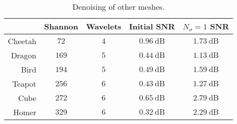 \begin{table}
	\centering
	\caption{
		Denoising of other meshes.
	}\label{tab:chapter4_denoising}
	\begin{tabular}{@{}rcccc@{}}
		\toprule
                & Shannon       & Wavelets    & Initial SNR         & \(N_{\sigma}=1\) SNR \\
		\midrule
        Cheetah & \(\num{72}\)  & \(\num{4}\) & \(\SI{0.96}{\dB}\)  & \(\SI{1.73}{\dB}\) \\
		Dragon  & \(\num{169}\) & \(\num{5}\) & \(\SI{0.44}{\dB}\)  & \(\SI{1.13}{\dB}\)   \\
		Bird    & \(\num{194}\) & \(\num{5}\) & \(\SI{0.49}{\dB}\)  & \(\SI{1.59}{\dB}\)   \\
		Teapot  & \(\num{256}\) & \(\num{6}\) & \(\SI{0.43}{\dB}\) & \(\SI{1.27}{\dB}\)  \\
		Cube    & \(\num{272}\) & \(\num{6}\) & \(\SI{0.65}{\dB}\)  & \(\SI{2.79}{\dB}\)   \\
		Homer   & \(\num{329}\) & \(\num{6}\) & \(\SI{0.32}{\dB}\)  & \(\SI{2.29}{\dB}\)   \\
		\bottomrule
	\end{tabular}
\end{table}
